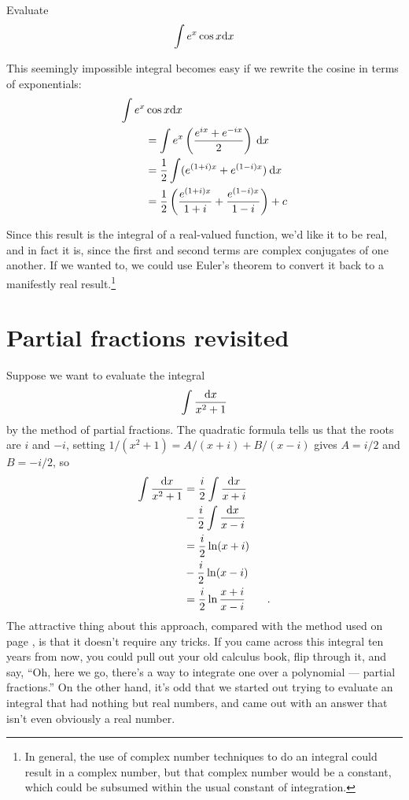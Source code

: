 \begin{eg}
\egquestion Evaluate
\begin{equation*}
  \int e^x \cos x \textup{d} x
\end{equation*}

\eganswer This seemingly impossible integral becomes easy if we rewrite
the cosine in terms of exponentials:
\begin{align*}
  \int e^x & \cos x \textup{d} x \\
      &= \int e^x \left(\frac{e^{ix}+e^{-ix}}{2}\right) \:\textup{d} x \\
      &= \frac{1}{2} \int (e^{(1+i)x}+e^{(1-i)x})\:\textup{d} x \\
      &= \frac{1}{2} \left( \frac{e^{(1+i)x}}{1+i}+\frac{e^{(1-i)x}}{1-i} \right)+ c
\end{align*}

Since this result is the integral of a real-valued function, we'd like it to be
real, and in fact it is, since the first and second terms are complex conjugates of
one another. If we wanted to, we could use Euler's theorem to convert it back to
a manifestly real result.\footnote{In general, the use of complex number techniques to
do an integral could result in a complex number, but that complex number would
be a constant, which could be subsumed within the usual constant of integration.}

\end{eg}

\section{Partial fractions revisited}\label{sec:complex-part-frac}

Suppose we want to evaluate the integral
\begin{equation*}
  \int \frac{\textup{d} x}{x^2+1}
\end{equation*}
by the method of partial fractions. The quadratic formula tells us that the
roots are $i$ and $-i$, setting
$1/(x^2+1)=A/(x+i)+B/(x-i)$ gives $A=i/2$ and $B=-i/2$, so
\begin{align*}
  \int \frac{\textup{d} x}{x^2+1} &= \frac{i}{2} \int \frac{\textup{d} x}{x+i} \\
                            &  -\frac{i}{2}\int \frac{\textup{d} x}{x-i} \\
      &= \frac{i}{2}\ln(x+i)\\
        &-\frac{i}{2}\ln(x-i) \\
      &= \frac{i}{2}\ln\frac{x+i}{x-i} \qquad .
\end{align*}
The attractive thing about this approach, compared with the method
used on page \pageref{eg:arctan}, is that it doesn't require any
tricks. If you came across this integral ten years from now, you
could pull out your old calculus book, flip through it, and say,
``Oh, here we go, there's a way to integrate one over a polynomial ---
partial fractions.'' On the other hand, it's odd that we started out
trying to evaluate an integral that had nothing but real numbers,
and came out with an answer that isn't even obviously a real number.

